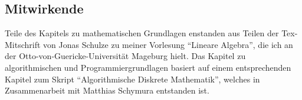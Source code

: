 \subsection*{Mitwirkende}

Teile des Kapitels zu mathematischen Grundlagen enstanden aus Teilen der Tex-Mitschrift von Jonas Schulze zu meiner Vorlesung ``Lineare Algebra'', die ich an der Otto-von-Guericke-Universität Mageburg hielt. Das Kapitel zu algorithmischen und Programmiergrundlagen basiert auf einem entsprechenden Kapitel zum Skript ``Algorithmische Diskrete Mathematik'', welches in Zusammenarbeit mit Matthias Schymura entstanden ist. 
